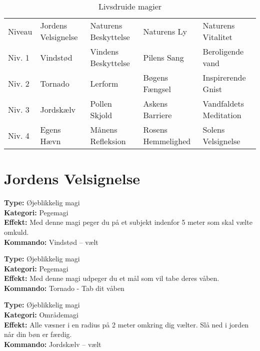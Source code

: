 \begin{table}[H]
    \centering
    \begin{tabular}{|p{}|p{}|p{}|p{}|p{}|}
    \hline
    \rowcolor{cerulean!80}
    \multicolumn{5}{c}{Livsdruide magi}\\
    \hline
    \rowcolor{cerulean!40}
         Niveau & Jordens Velsignelse & Naturens Beskyttelse & Naturens Ly & Naturens Vitalitet \\\hline
         Niv. 1 & Vindstød & Vindens Beskyttelse & Pilens Sang & Beroligende vand\\\hline
         Niv. 2 & Tornado & Lerform & Bøgens Fængsel & Inspirerende Gnist\\\hline
         Niv. 3 & Jordskælv & Pollen Skjold & Askens Barriere & Vandfaldets Meditation\\\hline
         Niv. 4 & Egens Hævn & Månens Refleksion & Rosens Hemmelighed & Solens Velsignelse\\\hline
         \end{tabular}
         \caption{Livsdruide magier}
\end{table}
\newpage
\section{Jordens Velsignelse}
\begin{jord*}[Vindstød]
\textbf{Type:} Øjeblikkelig magi\\
\textbf{Kategori:} Pegemagi\\
\textbf{Effekt:} Med denne magi peger du på et subjekt indenfor 5 meter som skal vælte omkuld.\\
\textbf{Kommando:} Vindstød – vælt
\end{jord*}

\begin{jord*}[Tornado]
\textbf{Type:} Øjeblikkelig magi\\ 
\textbf{Kategori:} Pegemagi\\
\textbf{Effekt:} Med denne magi udpeger du et mål som vil tabe deres våben.\\
\textbf{Kommando:} Tornado - Tab dit våben\\
\end{jord*}

\begin{jord*}[Jordskælv]
\textbf{Type:} Øjeblikkelig magi\\
\textbf{Kategori:} Områdemagi\\
\textbf{Effekt:} Alle væsner i en radius på 2 meter omkring dig vælter. Slå ned i jorden når din bøn er færdig.\\
\textbf{Kommando:} Jordskælv – vælt
\end{jord*}

